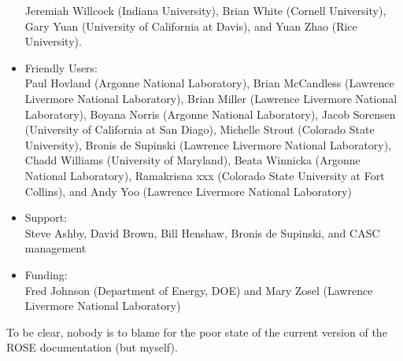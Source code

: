 \begin{itemize}
           Jeremiah Willcock (Indiana University),
           Brian White (Cornell University),
           Gary Yuan (University of California at Davis), and
           Yuan Zhao (Rice University).
     \item Friendly Users: \\
           Paul Hovland (Argonne National Laboratory),
           Brian McCandless (Lawrence Livermore National Laboratory),
           Brian Miller (Lawrence Livermore National Laboratory),
           Boyana Norris (Argonne National Laboratory),
           Jacob Sorensen (University of California at San Diago),
           Michelle Strout (Colorado State University),
           Bronis de Supinski (Lawrence Livermore National Laboratory),
           Chadd Williams (University of Maryland),
           Beata Winnicka (Argonne National Laboratory),
           Ramakrisna xxx (Colorado State University at Fort Collins), and
           Andy Yoo (Lawrence Livermore National Laboratory)
     \item Support: \\
           Steve Ashby,
           David Brown,
           Bill Henshaw,
           Bronis de Supinski, and
           CASC management
     \item Funding: \\
           Fred Johnson (Department of Energy, DOE) and
           Mary Zosel (Lawrence Livermore National Laboratory)
\end{itemize}


To be clear, nobody is to blame for the poor state of the current version of the 
ROSE documentation (but myself).






